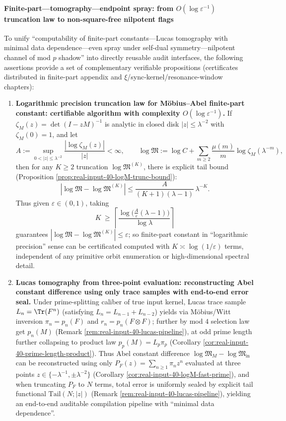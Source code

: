 \paragraph{Finite-part---tomography---endpoint spray: from \texorpdfstring{$O(\log\varepsilon^{-1})$}{O(log eps^-1)} truncation law to non-square-free nilpotent flags}
To unify ``computability of finite-part constants---Lucas tomography with minimal data dependence---even spray under self-dual symmetry---nilpotent channel of mod \(p\) shadow'' into directly reusable audit interfaces, the following assertions provide a set of complementary verifiable propositions (certificates distributed in finite-part appendix and \(\xi\)/sync-kernel/resonance-window chapters):
\begin{enumerate}
  \item \textbf{Logarithmic precision truncation law for M\"obius--Abel finite-part constant: certifiable algorithm with complexity \texorpdfstring{$O(\log\varepsilon^{-1})$}{O(log eps^-1)}.}
  If \(\zeta_M(z)=\det(I-zM)^{-1}\) is analytic in closed disk \(|z|\le \lambda^{-2}\) with \(\zeta_M(0)=1\), and let
  \[
  A:=\sup_{0<|z|\le \lambda^{-2}}\frac{|\log\zeta_M(z)|}{|z|}<\infty,
  \qquad
  \log\mathfrak{M}:=\log C+\sum_{m\ge 2}\frac{\mu(m)}{m}\log\zeta_M(\lambda^{-m}),
  \]
  then for any \(K\ge 2\) truncation \(\log\mathfrak{M}^{(K)}\), there is explicit tail bound (Proposition \ref{prop:real-input-40-logM-trunc-bound}):
  \[
  |\log\mathfrak{M}-\log\mathfrak{M}^{(K)}|
  \le \frac{A}{(K+1)(\lambda-1)}\,\lambda^{-K}.
  \]
  Thus given \(\varepsilon\in(0,1)\), taking
  \[
  K\ \ge\ \left\lceil \frac{\log\!\bigl(\tfrac{A}{\varepsilon}(\lambda-1)\bigr)}{\log \lambda}\right\rceil
  \]
  guarantees \(|\log\mathfrak{M}-\log\mathfrak{M}^{(K)}|\le \varepsilon\);
  so finite-part constant in ``logarithmic precision'' sense can be certificated computed with \(K\asymp \log(1/\varepsilon)\) terms, independent of any primitive orbit enumeration or high-dimensional spectral detail.

  \item \textbf{Lucas tomography from three-point evaluation: reconstructing Abel constant difference using only trace samples with end-to-end error seal.}
  Under prime-splitting caliber of true input kernel, Lucas trace sample \(L_n=\Tr(F^n)\) (satisfying \(L_n=L_{n-1}+L_{n-2}\)) yields via M\"obius/Witt inversion
  \(
  \pi_n=p_n(F)
  \)
  and
  \(
  r_n=p_n(F\otimes F)
  \);
  further by mod \(4\) selection law get \(p_n(M)\) (Remark \ref{rem:real-input-40-lucas-pipeline}), at odd prime length further collapsing to product law \(p_p(M)=L_p\pi_p\) (Corollary \ref{cor:real-input-40-prime-length-product}).
  Thus Abel constant difference \(\log\mathfrak{M}_M-\log\mathfrak{M}_{\mathrm{in}}\) can be reconstructed using only \(P_F(z)=\sum_{n\ge 1}\pi_n z^n\) evaluated at three points \(z\in\{-\lambda^{-1},\pm\lambda^{-2}\}\) (Corollary \ref{cor:real-input-40-logM-fast-prime}), and when truncating \(P_F\) to \(N\) terms, total error is uniformly sealed by explicit tail functional \(\mathrm{Tail}(N;|z|)\) (Remark \ref{rem:real-input-40-lucas-pipeline}), yielding an end-to-end auditable compilation pipeline with ``minimal data dependence''.


\end{enumerate}
